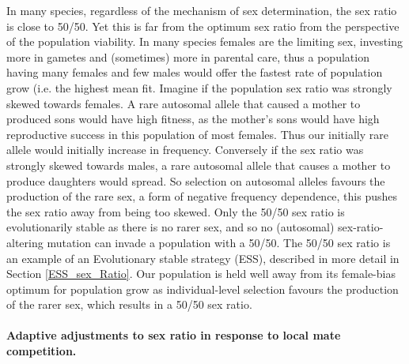 {In many species, regardless of the mechanism of sex determination, the sex ratio is close to 50/50. Yet this is far from the optimum sex ratio from the perspective of the population viability. In many species females are the limiting sex, investing more in gametes and (sometimes) more in parental care, thus a population having many females and few males would offer the fastest rate of population grow (i.e. the highest mean fit. 
Imagine if the population sex ratio was strongly skewed towards females. A rare autosomal allele that caused a mother to produced sons would have high fitness, as the mother's sons would have high reproductive success in this population of most females. Thus our initially rare allele would initially increase in frequency.
Conversely if the sex ratio was strongly skewed towards males, a rare autosomal allele that causes a mother to produce daughters would spread.
So selection on autosomal alleles favours the production of the rare sex, a form of negative frequency dependence, this pushes the sex ratio away from being too skewed. Only the 50/50 sex ratio is evolutionarily stable as there is no rarer sex, and so no (autosomal) sex-ratio-altering mutation can invade a population with a 50/50.
The 50/50 sex ratio is an example of an Evolutionary stable strategy
(ESS), described in more detail in Section
\ref{ESS_sex_Ratio}.  %
Our population is held well away from its female-bias optimum for population grow as individual-level selection favours the production of the rarer sex, which results in a 50/50 sex ratio.



\paragraph{Adaptive adjustments to sex ratio in response to local mate
  competition.}

}
